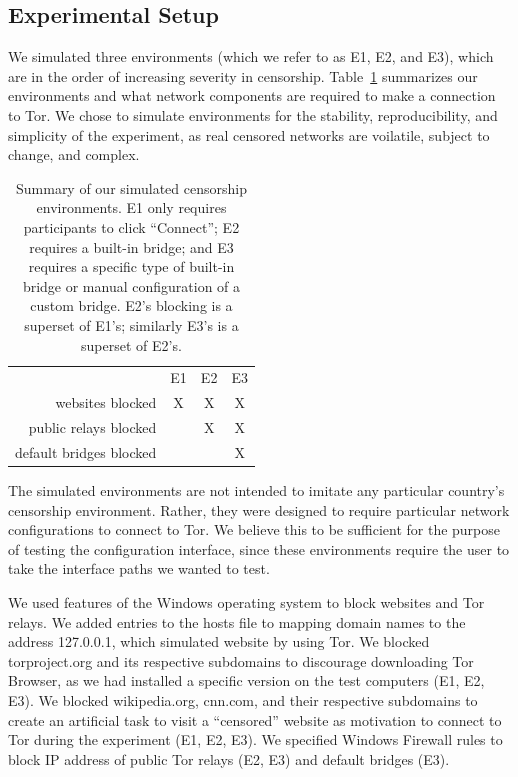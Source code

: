 \documentclass[USenglish,oneside,twocolumn]{article}
\begin{document}
\subsection{Experimental Setup}
\label{sec:environments}
We simulated three environments (which we refer to as E1, E2, and E3), 
which are in the order of increasing severity in censorship. Table~\ref{tab:environments} summarizes our environments and what network components are required to make a  connection to Tor. We chose to 
simulate environments for the stability, reproducibility, and simplicity of the 
experiment, as real censored networks are voilatile, subject to change, and complex. 

\begin{table}[t]
\centering
\begin{tabular}{r c c c}
& E1 & E2 & E3 \\
websites blocked & X & X & X \\
public relays blocked & & X & X \\
default bridges blocked & & & X \\
\end{tabular}
\caption{
Summary of our simulated censorship environments.
E1 only requires participants to click ``Connect'';
E2 requires a built-in bridge;
and E3 requires a specific type of built-in bridge
or manual configuration of a custom bridge.
E2's blocking is a superset of E1's;
similarly E3's is a superset of E2's.
}
\label{tab:environments}
\end{table}

The simulated environments are not intended to imitate any particular country's censorship environment. Rather, they were designed to require particular network configurations
to connect to Tor. We believe this to be sufficient for the purpose of testing the configuration interface, since these environments require the user to take the interface paths we wanted to test. 

We used features of the Windows operating system 
to block websites and Tor relays. 
We added entries to the hosts file to
mapping domain names to the address 127.0.0.1, which simulated
website by using Tor. We blocked torproject.org and its respective subdomains to discourage downloading Tor Browser, as we had installed a specific version on the test computers (E1, E2, E3).  We blocked wikipedia.org, cnn.com, and their respective subdomains to create an artificial task to visit a 
``censored'' website as motivation to connect to Tor during the experiment (E1, E2, E3). 
We specified Windows Firewall rules to block IP address of public Tor relays (E2, E3) and default bridges (E3).
\end{document}
